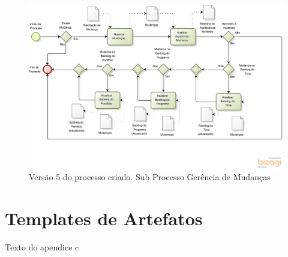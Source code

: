 \begin{apendicesenv}
\begin{figure}[H]
    \centering
	\includegraphics[keepaspectratio=true,scale=0.53]{figuras/evolucao_processo/Processo_v5_3.eps}
    \caption{Versão 5 do processo criado. Sub Processo Gerência de Mudanças }
    \label{fig:processo}
\end{figure}

\chapter{Templates de Artefatos}\label{apendice:templates}

Texto do apendice c

\end{apendicesenv}
